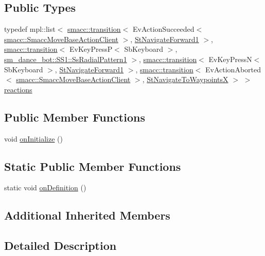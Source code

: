 \subsection*{Public Types}
\begin{DoxyCompactItemize}
\item 
typedef mpl\+::list$<$ \hyperlink{classsmacc_1_1transition}{smacc\+::transition}$<$ Ev\+Action\+Succeeded$<$ \hyperlink{classsmacc_1_1SmaccMoveBaseActionClient}{smacc\+::\+Smacc\+Move\+Base\+Action\+Client} $>$, \hyperlink{structStNavigateForward1}{St\+Navigate\+Forward1} $>$, \hyperlink{classsmacc_1_1transition}{smacc\+::transition}$<$ Ev\+Key\+PressP$<$ Sb\+Keyboard $>$, \hyperlink{structsm__dance__bot_1_1SS1_1_1SsRadialPattern1}{sm\+\_\+dance\+\_\+bot\+::\+S\+S1\+::\+Ss\+Radial\+Pattern1} $>$, \hyperlink{classsmacc_1_1transition}{smacc\+::transition}$<$ Ev\+Key\+PressN$<$ Sb\+Keyboard $>$, \hyperlink{structStNavigateForward1}{St\+Navigate\+Forward1} $>$, \hyperlink{classsmacc_1_1transition}{smacc\+::transition}$<$ Ev\+Action\+Aborted$<$ \hyperlink{classsmacc_1_1SmaccMoveBaseActionClient}{smacc\+::\+Smacc\+Move\+Base\+Action\+Client} $>$, \hyperlink{structStNavigateToWaypointsX}{St\+Navigate\+To\+WaypointsX} $>$ $>$ \hyperlink{structStRotateDegrees1_a58355bb00a68cc768ef81fd884774811}{reactions}
\end{DoxyCompactItemize}
\subsection*{Public Member Functions}
\begin{DoxyCompactItemize}
\item 
void \hyperlink{structStRotateDegrees1_a43811c7ec53572baf0c9e6d6fc15909e}{on\+Initialize} ()
\end{DoxyCompactItemize}
\subsection*{Static Public Member Functions}
\begin{DoxyCompactItemize}
\item 
static void \hyperlink{structStRotateDegrees1_a4d11c284fe1956ae6ae0a4f8c1b5eb37}{on\+Definition} ()
\end{DoxyCompactItemize}
\subsection*{Additional Inherited Members}


\subsection{Detailed Description}


